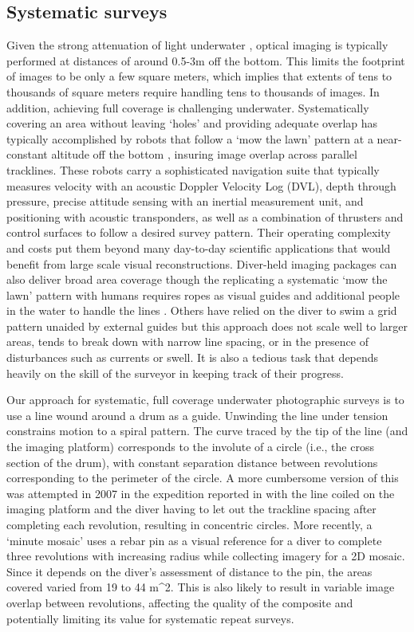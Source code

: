 \subsection{Systematic surveys}
Given the strong attenuation of light underwater \cite{Duntley_1963}, optical imaging is typically performed at distances of around 0.5-3m off the bottom. This limits the footprint of images to be only a few square meters, which implies that extents of tens to thousands of square meters require handling tens to thousands of images. In addition, achieving full coverage is challenging underwater. Systematically covering an area without leaving `holes' and providing adequate overlap has typically accomplished by robots that follow a `mow the lawn' pattern at a near-constant altitude off the bottom \cite{Bingham_2010}\cite{Williams_2010}, insuring image overlap across parallel tracklines. These robots carry a sophisticated navigation suite that typically measures velocity with an acoustic Doppler Velocity Log (DVL), depth through pressure, precise attitude sensing with an inertial measurement unit, and positioning with acoustic transponders, as well as a combination of thrusters and control surfaces to follow a desired survey pattern. Their operating complexity and costs put them beyond many day-to-day scientific applications that would benefit from large scale visual reconstructions.
Diver-held imaging packages can also deliver broad area coverage though the replicating a systematic `mow the lawn' pattern with humans requires ropes as visual guides and additional people in the water to handle the lines \cite{Henderson_2013}. Others \cite{Burns_2015} have relied on the diver to swim a grid pattern unaided by external guides but this approach does not scale well to larger areas, tends to break down with narrow line spacing, or in the presence of disturbances such as currents or swell. It is also a tedious task that depends heavily on the skill of the surveyor in keeping track of their progress.

Our approach for systematic, full coverage underwater photographic surveys is to use a line wound around a drum as a guide. Unwinding the line under tension constrains motion to a spiral pattern. The curve traced by the tip of the line (and the imaging platform) corresponds to the involute of a circle (i.e., the cross section of the drum), with constant separation distance between revolutions corresponding to the perimeter of the circle. A more cumbersome version of this was attempted in 2007 in the expedition reported in \cite{Camilli_2007} with the line coiled on the imaging platform and the diver having to let out the trackline spacing after completing each revolution, resulting in concentric circles. More recently, a `minute mosaic' \cite{gintert2012third} uses a rebar pin as a visual reference for a diver to complete three revolutions with increasing radius while collecting imagery for a 2D mosaic. Since it depends on the diver's assessment of distance to the pin, the areas covered varied from 19 to 44 m^{2}. This is also likely to result in variable image overlap between revolutions, affecting the quality of the composite and potentially limiting its value for systematic repeat surveys.

